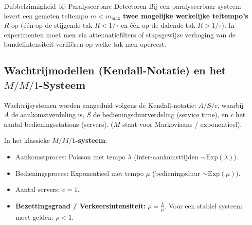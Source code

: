 \documentclass[11pt,a4paper]{article}
\begin{document}
\begin{fysicabox}{Dubbelzinnigheid bij Paralyseerbare Detectoren}
Bij een paralyseerbaar systeem levert een gemeten teltempo $m < m_{\max}$ \textbf{twee mogelijke werkelijke teltempo's} $R$ op (één op de stijgende tak $R < 1/\tau$ en één op de dalende tak $R > 1/\tau$). In experimenten moet men via attenuatiefilters of stapsgewijze verhoging van de bundelintensiteit verifiëren op welke tak men opereert.
\end{fysicabox}

\subsection{Wachtrijmodellen (Kendall-Notatie) en het \texorpdfstring{$M/M/1$}{M/M/1}-Systeem}
Wachtrijsystemen worden aangeduid volgens de Kendall-notatie: $A / S / c$, waarbij $A$ de aankomstverdeling is, $S$ de bedieningsduurverdeling (service time), en $c$ het aantal bedieningsstations (servers). ($M$ staat voor Markoviaans / exponentieel).

In het klassieke \textbf{$M/M/1$-systeem}:
\begin{itemize}[leftmargin=1.5em]
    \item Aankomstproces: Poisson met tempo $\lambda$ (inter-aankomsttijden $\sim \text{Exp}(\lambda)$).
    \item Bedieningsproces: Exponentieel met tempo $\mu$ (bedieningsduur $\sim \text{Exp}(\mu)$).
    \item Aantal servers: $c = 1$.
    \item \textbf{Bezettingsgraad / Verkeersintensiteit:} $\rho = \frac{\lambda}{\mu}$.
    Voor een stabiel systeem moet gelden: $\rho < 1$.
\end{itemize}
\end{document}

